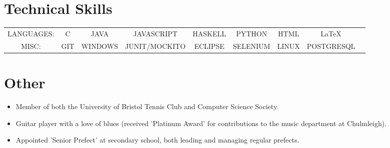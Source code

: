 \documentclass{cvclass}
\begin{document}
\section{Technical Skills}
\begin{tabular}{ c c c c c c c c c }
  LANGUAGES: & C & JAVA & JAVASCRIPT & HASKELL & PYTHON & HTML & \LaTeX\\
  MISC: & GIT & WINDOWS & JUNIT/MOCKITO & ECLIPSE & SELENIUM & LINUX & POSTGRESQL
\end{tabular}\newline

\section{Other}
\begin{itemize}
  \item Member of both the University of Bristol Tennis Club and Computer Science Society.
  \item  Guitar player with a love of blues (received 'Platinum Award' for contributions to the music department at Chulmleigh).
  \item Appointed 'Senior Prefect' at secondary school, both leading and managing regular prefects.
\end{itemize}
\end{document}
